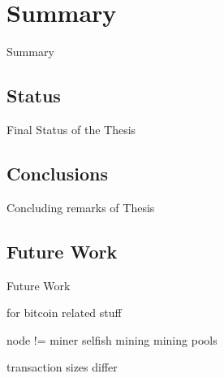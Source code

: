 \chapter{Summary} \label{chapter:summary}

Summary

\section{Status} 
\label{sec:status}

Final Status of the Thesis

\section{Conclusions}
\label{sec:conclusions}

Concluding remarks of Thesis

\section{Future Work} 
\label{sec:futureWork}

Future Work

for bitcoin related stuff

node != miner
selfish mining
mining pools

transaction sizes differ